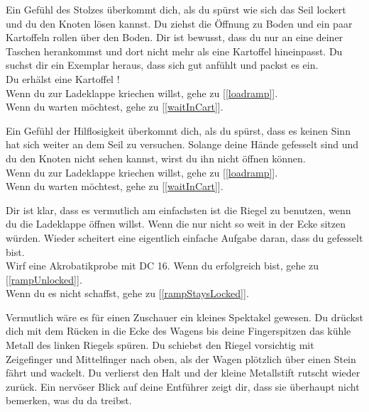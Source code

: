 
Ein Gefühl des Stolzes überkommt dich, als du spürst wie sich das Seil lockert und du den Knoten lösen kannst. Du ziehst die Öffnung zu Boden und ein paar Kartoffeln rollen über den Boden. Dir ist bewusst, dass du nur an eine deiner Taschen herankommst und dort nicht mehr als eine Kartoffel hineinpasst. Du suchst dir ein Exemplar heraus, dass sich gut anfühlt und packst es ein.
\\Du erhälst eine Kartoffel !
\\Wenn du zur Ladeklappe kriechen willst, gehe zu [\ref{loadramp}].
\\Wenn du warten möchtest, gehe zu [\ref{waitInCart}].


Ein Gefühl der Hilflosigkeit überkommt dich, als du spürst, dass es keinen Sinn hat sich weiter an dem Seil zu versuchen. Solange deine Hände gefesselt sind und du den Knoten nicht sehen kannst, wirst du ihn nicht öffnen können.
\\Wenn du zur Ladeklappe kriechen willst, gehe zu [\ref{loadramp}].
\\Wenn du warten möchtest, gehe zu [\ref{waitInCart}].


Dir ist klar, dass es vermutlich am einfachsten ist die Riegel zu benutzen, wenn du die Ladeklappe öffnen willst. Wenn die nur nicht so weit in der Ecke sitzen würden. Wieder scheitert eine eigentlich einfache Aufgabe daran, dass du gefesselt bist. \\
Wirf eine Akrobatikprobe mit DC 16. Wenn du erfolgreich bist, gehe zu [\ref{rampUnlocked}].
\\Wenn du es nicht schaffst, gehe zu [\ref{rampStaysLocked}].


Vermutlich wäre es für einen Zuschauer ein kleines Spektakel gewesen. Du drückst dich mit dem Rücken in die Ecke des Wagens bis deine Fingerspitzen das kühle Metall des linken Riegels spüren. Du schiebst den Riegel vorsichtig mit Zeigefinger und Mittelfinger nach oben, als der Wagen plötzlich über einen Stein fährt und wackelt. Du verlierst den Halt und der kleine Metallstift rutscht wieder zurück. Ein nervöser Blick auf deine Entführer zeigt dir, dass sie überhaupt nicht bemerken, was du da treibst.

